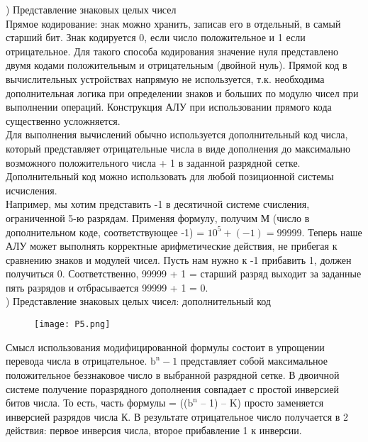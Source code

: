 ) Представление знаковых целых чисел \\
Прямое кодирование: знак можно хранить, записав его в отдельный, в самый старший бит. Знак кодируется 0, если число положительное и 1 если отрицательное. Для такого способа кодирования значение нуля представлено двумя кодами положительным и отрицательным (двойной нуль). Прямой код в вычислительных устройствах напрямую не используется, т.к. необходима дополнительная логика при определении знаков и больших по модулю чисел при выполнении операций. Конструкция АЛУ при использовании прямого кода существенно усложняется. \\
Для выполнения вычислений обычно используется дополнительный код числа, который представляет отрицательные числа в виде дополнения до максимально возможного положительного числа + 1 в заданной разрядной сетке. Дополнительный код можно использовать для любой позиционной системы исчисления.  \\
Например, мы хотим представить -1 в десятичной системе счисления, ограниченной 5-ю разрядам. Применяя формулу, получим М (число в дополнительном коде, соответствующее -1) = $10^5 + (-1) = 99999$. Теперь наше АЛУ может выполнять корректные арифметические действия, не прибегая к сравнению знаков и модулей чисел. Пусть нам нужно к -1 прибавить 1, должен получиться 0. Соответственно, 99999 + 1 = старший разряд выходит за заданные пять разрядов и отбрасывается 99999 + 1 = 0. \\

) Представление знаковых целых чисел: дополнительный код \\
\begin{figure}[H]
    \centering
    \texttt{[image: P5.png]}
\end{figure}
\noindent Смысл использования модифицированной формулы состоит в упрощении перевода числа в отрицательное. $\text{b}^{\text{n}}-1$ представляет собой максимальное положительное беззнаковое число в выбранной разрядной сетке. В двоичной системе получение поразрядного дополнения совпадает с простой инверсией битов числа. То есть, часть формулы = (($\text{b}^{\text{n}}$ – 1) – K) просто заменяется инверсией разрядов числа К. В результате отрицательное число получается в 2 действия: первое инверсия числа, второе прибавление 1 к инверсии. \\ 


